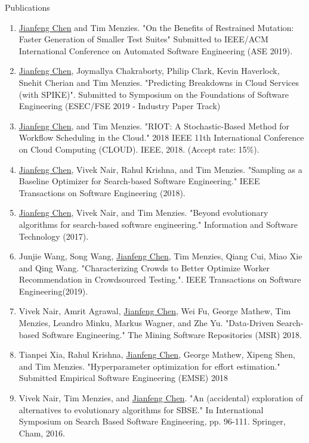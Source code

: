 \documentclass{resume} %
\begin{document}
\begin{rSection}{ Publications} 
\begin{enumerate}[wide, labelwidth=!, labelindent=0pt]
\item \underline{Jianfeng Chen} and Tim Menzies. "On the Benefits of Restrained Mutation: Faster Generation of Smaller Test Suites" Submitted to IEEE/ACM International Conference on Automated Software Engineering (ASE 2019).
\item \underline{Jianfeng Chen}, Joymallya Chakraborty, Philip Clark, Kevin Haverlock, Snehit Cherian and Tim Menzies. "Predicting Breakdowns in Cloud Services (with SPIKE)". Submitted to Symposium on the Foundations of Software Engineering (ESEC/FSE 2019 - Industry Paper Track)
\item \underline{Jianfeng Chen}, and Tim Menzies. "RIOT: A Stochastic-Based Method for Workflow Scheduling in the Cloud." 2018 IEEE 11th International Conference on Cloud Computing (CLOUD). IEEE, 2018. (Accept rate: 15\%).
\item \underline{Jianfeng Chen}, Vivek Nair, Rahul Krishna, and Tim Menzies. "Sampling as a Baseline Optimizer for Search-based Software Engineering." IEEE Transactions on Software Engineering (2018).
\item \underline{Jianfeng Chen}, Vivek Nair, and Tim Menzies. "Beyond evolutionary algorithms for search-based software engineering." Information and Software Technology (2017).

\item Junjie Wang, Song Wang, \underline{Jianfeng Chen}, Tim Menzies, Qiang Cui, Miao Xie and  Qing Wang. "Characterizing Crowds to Better Optimize Worker Recommendation in Crowdsourced Testing.". IEEE Transactions on Software Engineering(2019).
\item Vivek Nair, Amrit Agrawal, \underline{Jianfeng Chen}, Wei Fu, George Mathew, Tim Menzies, Leandro Minku, Markus Wagner, and Zhe Yu. "Data-Driven Search-based Software Engineering." The Mining Software Repositories (MSR) 2018.
\item Tianpei Xia, Rahul Krishna, \underline{Jianfeng Chen}, George Mathew, Xipeng Shen, and Tim Menzies. "Hyperparameter optimization for effort estimation." Submitted Empirical Software Engineering (EMSE) 2018
\item Vivek Nair, Tim Menzies, and \underline{Jianfeng Chen}. "An (accidental) exploration of alternatives to evolutionary algorithms for SBSE." In International Symposium on Search Based Software Engineering, pp. 96-111. Springer, Cham, 2016.
\end{enumerate}
\end{rSection}
\end{document}
